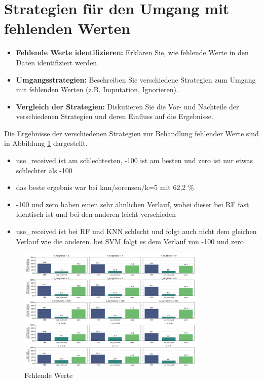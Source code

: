 \section{Strategien für den Umgang mit fehlenden Werten}
\begin{itemize}
    \item \textbf{Fehlende Werte identifizieren:} Erklären Sie, wie fehlende Werte in den Daten identifiziert werden.
    \item \textbf{Umgangsstrategien:} Beschreiben Sie verschiedene Strategien zum Umgang mit fehlenden Werten (z.B. Imputation, Ignorieren).
    \item \textbf{Vergleich der Strategien:} Diskutieren Sie die Vor- und Nachteile der verschiedenen Strategien und deren Einfluss auf die Ergebnisse.
\end{itemize}

Die Ergebnisse der verschiedenen Strategien zur Behandlung fehlender Werte sind in Abbildung \ref{fig:3_handle_missing_values_strategy_01} dargestellt.

\begin{itemize}
    \item use\_received ist am schlechtesten, -100 ist am besten und zero ist nur etwas schlechter als -100
    \item das beste ergebnis war bei knn/sorensen/k=5 mit 62,2 \% 
    \item -100 und zero haben einen sehr ähnlichen Verlauf, wobei dieser bei RF fast identisch ist und bei den anderen leicht verschieden
    \item use\_received ist bei RF und KNN schlecht und folgt auch nicht dem gleichen Verlauf wie die anderen. bei SVM folgt es dem Verlauf von -100 und zero
\end{itemize}

\begin{figure}[H]
    \centering
    \includegraphics[width=0.8\textwidth]{images/3_handle_missing_values_strategy_01.png}
    \caption{Fehlende Werte}
    \label{fig:3_handle_missing_values_strategy_01}
\end{figure}

